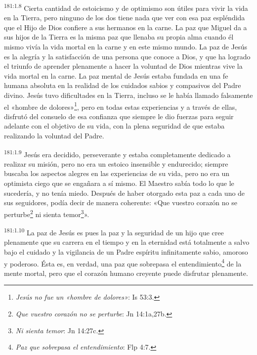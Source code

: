 \par
\textsuperscript{181:1.8} Cierta cantidad de estoicismo y de optimismo son útiles para vivir la vida en la Tierra, pero ninguno de los dos tiene nada que ver con esa paz espléndida que el Hijo de Dios confiere a sus hermanos en la carne. La paz que Miguel da a sus hijos de la Tierra es la misma paz que llenaba su propia alma cuando él mismo vivía la vida mortal en la carne y en este mismo mundo. La paz de Jesús es la alegría y la satisfacción de una persona que conoce a Dios, y que ha logrado el triunfo de aprender plenamente a hacer la voluntad de Dios mientras vive la vida mortal en la carne. La paz mental de Jesús estaba fundada en una fe humana absoluta en la realidad de los cuidados sabios y compasivos del Padre divino. Jesús tuvo dificultades en la Tierra, incluso se le había llamado falsamente el «hombre de dolores»\footnote{\textit{Jesús no fue un «hombre de dolores»}: Is 53:3.}, pero en todas estas experiencias y a través de ellas, disfrutó del consuelo de esa confianza que siempre le dio fuerzas para seguir adelante con el objetivo de su vida, con la plena seguridad de que estaba realizando la voluntad del Padre.

\par
\textsuperscript{181:1.9} Jesús era decidido, perseverante y estaba completamente dedicado a realizar su misión, pero no era un estoico insensible y endurecido; siempre buscaba los aspectos alegres en las experiencias de su vida, pero no era un optimista ciego que se engañara a sí mismo. El Maestro sabía todo lo que le sucedería, y no tenía miedo. Después de haber otorgado esta paz a cada uno de sus seguidores, podía decir de manera coherente: «Que vuestro corazón no se perturbe\footnote{\textit{Que vuestro corazón no se perturbe}: Jn 14:1a,27b.} ni sienta temor\footnote{\textit{Ni sienta temor}: Jn 14:27c.}».

\par
\textsuperscript{181:1.10} La paz de Jesús es pues la paz y la seguridad de un hijo que cree plenamente que su carrera en el tiempo y en la eternidad está totalmente a salvo bajo el cuidado y la vigilancia de un Padre espíritu infinitamente sabio, amoroso y poderoso. Ésta es, en verdad, una paz que sobrepasa el entendimiento\footnote{\textit{Paz que sobrepasa el entendimiento}: Flp 4:7.} de la mente mortal, pero que el corazón humano creyente puede disfrutar plenamente.

